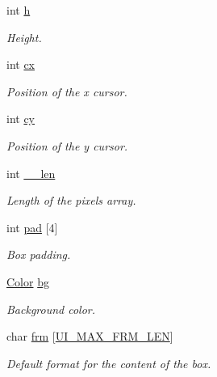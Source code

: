\begin{DoxyCompactItemize}
$$int \hyperlink{struct__Ui__box_ab81930762400818df39bd6acc348d26f}{h}
\begin{DoxyCompactList}\small\item\em Height. \end{DoxyCompactList}\item 
\mbox{\label{struct__Ui__box_aa44d253872cfb9297e3fa71b93d9fc88}} 
int \hyperlink{struct__Ui__box_aa44d253872cfb9297e3fa71b93d9fc88}{cx}
\begin{DoxyCompactList}\small\item\em Position of the x cursor. \end{DoxyCompactList}\item 
\mbox{\label{struct__Ui__box_a993ecc3e3509632642cb403b731d9a6d}} 
int \hyperlink{struct__Ui__box_a993ecc3e3509632642cb403b731d9a6d}{cy}
\begin{DoxyCompactList}\small\item\em Position of the y cursor. \end{DoxyCompactList}\item 
\mbox{\label{struct__Ui__box_ade30a16b2e23d494a77767ce516f00d9}} 
int \hyperlink{struct__Ui__box_ade30a16b2e23d494a77767ce516f00d9}{\+\_\+\+\_\+len}
\begin{DoxyCompactList}\small\item\em Length of the pixels array. \end{DoxyCompactList}\item 
\mbox{\label{struct__Ui__box_a4030a2fd2487e5a4cde2b4fccc999166}} 
int \hyperlink{struct__Ui__box_a4030a2fd2487e5a4cde2b4fccc999166}{pad} \mbox{[}4\mbox{]}
\begin{DoxyCompactList}\small\item\em Box padding. \end{DoxyCompactList}\item 
\mbox{\label{struct__Ui__box_a2562527c18b6318ba537faae8dd2d06c}} 
\hyperlink{ui_8h_ab87bacfdad76e61b9412d7124be44c1c}{Color} \hyperlink{struct__Ui__box_a2562527c18b6318ba537faae8dd2d06c}{bg}
\begin{DoxyCompactList}\small\item\em Background color. \end{DoxyCompactList}\item 
\mbox{\label{struct__Ui__box_aaa5235adc2488f7f4ae651d8672c5c11}} 
char \hyperlink{struct__Ui__box_aaa5235adc2488f7f4ae651d8672c5c11}{frm} \mbox{[}\hyperlink{ui_8c_aab208380ff579bef5fd8b91fa0c0215a}{U\+I\+\_\+\+M\+A\+X\+\_\+\+F\+R\+M\+\_\+\+L\+EN}\mbox{]}
\begin{DoxyCompactList}\small\item\em Default format for the content of the box. \end{DoxyCompactList}\end{DoxyCompactItemize}


